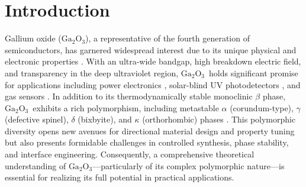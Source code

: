 \documentclass[%
reprint,
superscriptaddress,
 amsmath,amssymb,
 aps,
]{revtex4-2}
\newcommand{\ga}{$\text{Ga}_2\text{O}_3$}
\begin{document}
\begin{abstract}
Gallium oxide (\ga) is a wide-bandgap semiconductor with promising applications in 
high-power and high-frequency electronics. 
However, its complex polymorphic nature poses substantial challenges for fundamental 
studies, particularly in understanding phase-transformation behaviors under nonequilibrium conditions.
Here, we develop a robust, accurate, and computationally efficient machine-learning 
interatomic potential (MLIP) for \ga\ based on the neuroevolution potential (NEP) 
framework combined with an energy-dependent weighting strategy. 
The resulting NEP potential demonstrates clear advantages over the 
state-of-the-art tabGAP potential with respect to both accuracy and computational efficiency. 
Furthermore, we introduce a physically process-oriented sampling strategy to 
systematically augment the training dataset, thereby enhancing the MLIP performance 
for targeted physical phenomena. 
As a representative application, a dedicated NEP potential is constructed for swift heavy-ion (SHI) 
irradiation simulations of $\beta$-\ga. 
The simulated results are in quantitative agreement with experimental 
observations and provide a consistent physical explanation for the reported 
experimental discrepancies regarding phase transformations in the ion track of $\beta$-\ga.
\end{abstract}

\maketitle


\section{Introduction}

Gallium oxide (\ga), a representative of the fourth generation of 
semiconductors, has garnered widespread interest due to its unique physical and 
electronic properties \cite{pearton_review_2017}.
With an ultra-wide bandgap, high breakdown electric field, and transparency in the 
deep ultraviolet region, \ga\ holds significant promise for applications including power 
electronics \cite{tadjer_toward_2022}, solar-blind UV photodetectors \cite{pratiyush2019advances}, 
and gas sensors \cite{zhu_gallium_2022}. 
In addition to its thermodynamically stable monoclinic $\beta$ phase, \ga\ exhibits a 
rich polymorphism, including metastable $\alpha$ (corundum-type), $\gamma$ 
(defective spinel), $\delta$ (bixbyite), and $\kappa$ (orthorhombic) phases \cite{yoshioka_structures_2007}. 
This polymorphic diversity opens new avenues for directional material design and property 
tuning but also presents formidable challenges in controlled synthesis, phase stability, 
and interface engineering.
Consequently, a comprehensive theoretical understanding of \ga---particularly of its 
complex polymorphic nature---is essential for realizing its full potential in practical 
applications.
\end{document}
